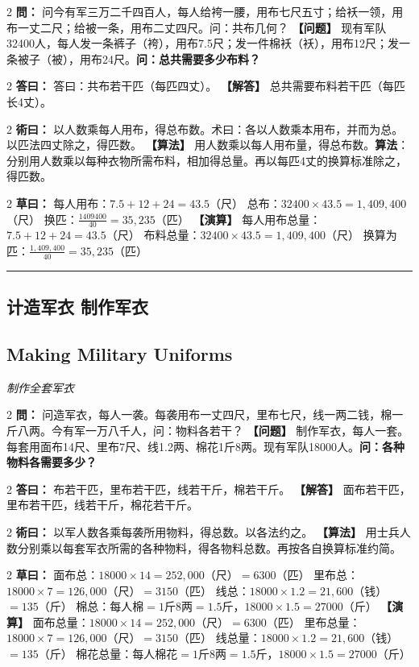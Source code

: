\documentclass[11pt,a4paper]{article}
\newcommand{\longline}{\noindent\rule{\textwidth}{0.4pt}}
\newcommand{\bilingualProblem}[2]{%
  \vspace{0.6em}%
  \begin{paracol}{2}%
  \noindent\textcolor{problemcolor}{\textbf{問：}}#1%
  \switchcolumn%
  \noindent\textcolor{problemcolor}{\textbf{【问题】}}#2%
  \end{paracol}%
  \vspace{0.3em}%
}
\newcommand{\bilingualAnswer}[2]{%
  \begin{paracol}{2}%
  \noindent\textcolor{answercolor}{\textbf{答曰：}}#1%
  \switchcolumn%
  \noindent\textcolor{answercolor}{\textbf{【解答】}}#2%
  \end{paracol}%
  \vspace{0.3em}%
}
\newcommand{\bilingualMethod}[2]{%
  \begin{paracol}{2}%
  \noindent\textcolor{methodcolor}{\textbf{術曰：}}#1%
  \switchcolumn%
  \noindent\textcolor{methodcolor}{\textbf{【算法】}}#2%
  \end{paracol}%
  \vspace{0.3em}%
}
\newcommand{\bilingualWorking}[2]{%
  \begin{paracol}{2}%
  \noindent\textcolor{workingcolor}{\textbf{草曰：}}#1%
  \switchcolumn%
  \noindent\textcolor{workingcolor}{\textbf{【演算】}}#2%
  \end{paracol}%
  \vspace{0.3em}%
}
\newcommand{\bilingualSubsection}[2]{%
  \subsection{#1}
  \begin{center}
  {\small\color{sectioncolor}\textit{#2}}
  \end{center}
  \vspace{0.3em}
}
\begin{document}
\bilingualProblem{%
问今有军三万二千四百人，每人给袴一腰，用布七尺五寸；给袄一领，用布一丈二尺；给被一条，用布二丈四尺。问：共布几何？%
}{%
现有军队32400人，每人发一条裤子（袴），用布7.5尺；发一件棉袄（袄），用布12尺；发一条被子（被），用布24尺。\textbf{问：总共需要多少布料？}%
}

\bilingualAnswer{%
答曰：共布若干匹（每匹四丈）。%
}{%
总共需要布料若干匹（每匹长4丈）。%
}

\bilingualMethod{%
以人数乘每人用布，得总布数。术曰：各以人数乘本用布，并而为总。以匹法四丈除之，得匹数。%
}{%
用人数乘以每人用布量，得总布数。\textbf{算法}：分别用人数乘以每种衣物所需布料，相加得总量。再以每匹4丈的换算标准除之，得匹数。%
}

\bilingualWorking{%
每人用布：$7.5 + 12 + 24 = 43.5$（尺）
总布：$32400 \times 43.5 = 1{,}409{,}400$（尺）
换匹：$\displaystyle\frac{1409400}{40} = 35{,}235$（匹）%
}{%
每人用布总量：$7.5 + 12 + 24 = 43.5$（尺）
布料总量：$32400 \times 43.5 = 1{,}409{,}400$（尺）
换算为匹：$\displaystyle\frac{1{,}409{,}400}{40} = 35{,}235$（匹）%
}

\vspace{0.5em}
\longline

\subsection{计造军衣 \quad 制作军衣}
\bilingualSubsection{Making Military Uniforms}{制作全套军衣}

\bilingualProblem{%
问造军衣，每人一袭。每袭用布一丈四尺，里布七尺，线一两二钱，棉一斤八两。今有军一万八千人，问：物料各若干？%
}{%
制作军衣，每人一套。每套用面布14尺、里布7尺、线1.2两、棉花1斤8两。现有军队18000人。\textbf{问：各种物料各需要多少？}%
}

\bilingualAnswer{%
布若干匹，里布若干匹，线若干斤，棉若干斤。%
}{%
面布若干匹，里布若干匹，线若干斤，棉花若干斤。%
}

\bilingualMethod{%
以军人数各乘每袭所用物料，得总数。以各法约之。%
}{%
用士兵人数分别乘以每套军衣所需的各种物料，得各物料总数。再按各自换算标准约简。%
}

\bilingualWorking{%
面布总：$18000 \times 14 = 252{,}000$（尺）$= 6300$（匹）
里布总：$18000 \times 7 = 126{,}000$（尺）$= 3150$（匹）
线总：$18000 \times 1.2 = 21{,}600$（钱）$= 135$（斤）
棉总：每人棉$= 1$斤$8$两$= 1.5$斤，$18000 \times 1.5 = 27000$（斤）%
}{%
面布总量：$18000 \times 14 = 252{,}000$（尺）$= 6300$（匹）
里布总量：$18000 \times 7 = 126{,}000$（尺）$= 3150$（匹）
线总量：$18000 \times 1.2 = 21{,}600$（钱）$= 135$（斤）
棉花总量：每人棉花$= 1$斤$8$两$= 1.5$斤，$18000 \times 1.5 = 27000$（斤）%
}
\end{document}
